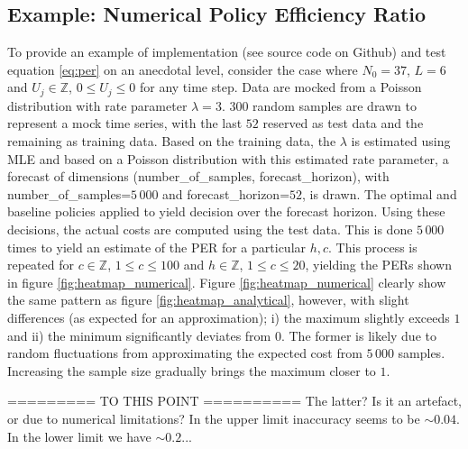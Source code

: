 \documentclass[a4paper,12pt]{article}
\begin{document}
	\subsection{Example: Numerical Policy Efficiency Ratio}
	To provide an example of implementation (see source code on Github) and test equation \eqref{eq:per} on an anecdotal level, consider the case where $N_0=37$, $L =6$ and $U_j\in \mathbb{Z}$, $0\leq U_j\leq 0$ for any time step. Data are mocked from a Poisson distribution with rate parameter $\lambda =3$. $300$ random samples are drawn to represent a mock time series, with the last $52$ reserved as test data and the remaining as training data. Based on the training data, the $\lambda$ is estimated using MLE and based on a Poisson distribution with this estimated rate parameter, a forecast of dimensions (number\_of\_samples, forecast\_horizon), with number\_of\_samples=$5\,000$ and forecast\_horizon=$52$, is drawn. The optimal and baseline policies applied to yield decision over the forecast horizon. Using these decisions, the actual costs are computed using the test data. This is done $5\,000$ times to yield an estimate of the PER for a particular $h,c$. This process is repeated for $c\in \mathbb{Z}$, $1\leq c\leq 100$ and $h\in \mathbb{Z}$, $1\leq c\leq 20$, yielding the PERs shown in figure \ref{fig:heatmap_numerical}. Figure \ref{fig:heatmap_numerical} clearly show the same pattern as figure \ref{fig:heatmap_analytical}, however, with slight differences (as expected for an approximation); i) the maximum slightly exceeds $1$ and ii) the minimum significantly deviates from $0$. The former is likely due to random fluctuations from approximating the expected cost from $5\, 000$ samples. Increasing the sample size gradually brings the maximum closer to $1$. 
	
	========= TO THIS POINT ==========
	{\color{red} The latter? Is it an artefact, or due to numerical limitations? In the upper limit inaccuracy seems to be $\sim 0.04$. In the lower limit we have $\sim 0.2$...}
	
\end{document}
